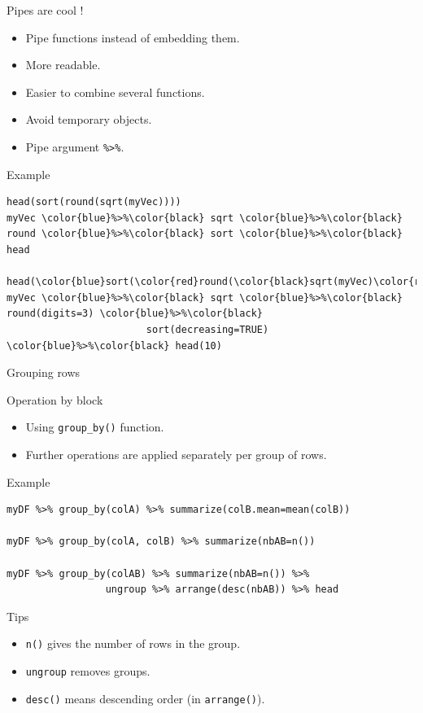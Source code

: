 \documentclass[10pt]{beamer}
\begin{document}
\begin{frame}[fragile]{Pipes are cool !}
  \begin{block}{}
    \begin{itemize}
    \item Pipe functions instead of embedding them.
    \item More readable.
    \item Easier to combine several functions.
    \item Avoid temporary objects.
    \item Pipe argument \verb!%>%!.
    \end{itemize}
  \end{block}
  \begin{exampleblock}{Example}
\begin{Verbatim}[commandchars=\\\{\}]
head(sort(round(sqrt(myVec))))
myVec \color{blue}%>%\color{black} sqrt \color{blue}%>%\color{black} round \color{blue}%>%\color{black} sort \color{blue}%>%\color{black} head

head(\color{blue}sort(\color{red}round(\color{black}sqrt(myVec)\color{red},digits=3)\color{blue},decreasing=TRUE)\color{black},10)
myVec \color{blue}%>%\color{black} sqrt \color{blue}%>%\color{black} round(digits=3) \color{blue}%>%\color{black}
                        sort(decreasing=TRUE) \color{blue}%>%\color{black} head(10)
\end{Verbatim}
  \end{exampleblock}
\end{frame}

\begin{frame}[fragile]{Grouping rows}
  \begin{block}{Operation by block}
    \begin{itemize}
    \item Using \verb!group_by()! function.
    \item Further operations are applied separately per group of rows.
    \end{itemize}
  \end{block}
  \begin{exampleblock}{Example}
\begin{lstlisting}
myDF %>% group_by(colA) %>% summarize(colB.mean=mean(colB))

myDF %>% group_by(colA, colB) %>% summarize(nbAB=n())

myDF %>% group_by(colAB) %>% summarize(nbAB=n()) %>%
                 ungroup %>% arrange(desc(nbAB)) %>% head
\end{lstlisting}
  \end{exampleblock}
  \begin{block}{Tips}
    \begin{itemize}
    \item \verb!n()! gives the number of rows in the group.
    \item \verb!ungroup! removes groups.
    \item \verb!desc()! means descending order (in \verb!arrange()!).
    \end{itemize}
  \end{block}
\end{frame}
\end{document}
